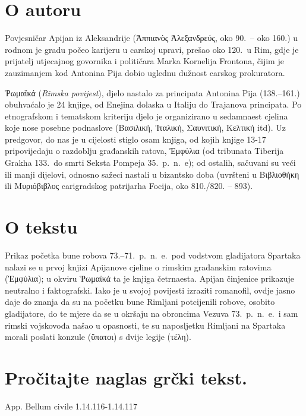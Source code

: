 \section*{O autoru}

Povjesničar Apijan iz Aleksandrije (Ἀππιανὸς Ἀλεξανδρεύς, oko 90.\ – oko 160.) u rodnom je gradu počeo karijeru u carskoj upravi, prešao oko 120.\ u Rim, gdje je prijatelj utjecajnog govornika i političara Marka Kornelija Frontona, čijim je zauzimanjem kod Antonina Pija dobio uglednu dužnost carskog prokuratora.

Ῥωμαϊκά (\textit{Rimska povijest}), djelo nastalo za principata Antonina Pija (138.–161.) obuhvaćalo je 24 knjige, od Enejina dolaska u Italiju do Trajanova principata. Po etnografskom i tematskom kriteriju djelo je organizirano u sedamnaest cjelina koje nose posebne podnaslove (Βασιλική, Ἰταλική, Σαυνιτική, Κελτική itd). Uz predgovor, do nas je u cijelosti stiglo osam knjiga, od kojih knjige 13-17 pripovijedaju o razdoblju građanskih ratova, Ἐμφύλια (od tribunata Tiberija Grakha 133.\ do smrti Seksta Pompeja 35.\ p.~n.~e); od ostalih, sačuvani su veći ili manji dijelovi, odnosno sažeci nastali u bizantsko doba (uvršteni u Βιβλιοθήκη ili Μυριόβιβλος carigradskog patrijarha Focija, oko 810./820. – 893).

\section*{O tekstu}

Prikaz početka bune robova 73.–71.\ p.~n.~e.\ pod vodstvom gladijatora Spartaka nalazi se u prvoj knjizi Apijanove cjeline o rimskim građanskim ratovima (Ἐμφύλια); u okviru Ῥωμαϊκά ta je knjiga četrnaesta. Apijan činjenice prikazuje neutralno i faktografski. Iako je u svojoj povijesti izraziti romanofil, ovdje jasno daje do znanja da su na početku bune Rimljani potcijenili robove, osobito gladijatore, do te mjere da se u okršaju na obroncima Vezuva 73.\ p.~n.~e.\ i sam rimski vojskovođa našao u opasnosti, te su naposljetku Rimljani na Spartaka morali poslati konzule (ὕπατοι) s dvije legije (τέλη).


\section*{Pročitajte naglas grčki tekst.}

App. Bellum civile 1.14.116-1.14.117


